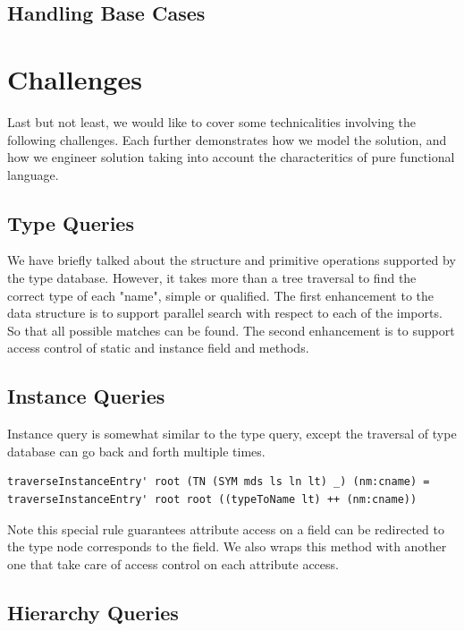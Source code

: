 \documentclass[12pt,letterpaper]{article}
\begin{document}
\subsection{Handling Base Cases}


\section{Challenges}
Last but not least, we would like to cover some technicalities involving the following challenges. Each further demonstrates how we model the solution, and how we engineer solution taking into account the characteritics of pure functional language.

\subsection{Type  Queries}
We have briefly talked about the structure and primitive operations supported by the type database. However, it takes more than a tree traversal to find the correct type of each "name", simple or qualified. The first enhancement to the data structure is to support parallel search with respect to each of the imports. So that all possible matches can be found. The second enhancement is to support access control of static and instance field and methods.

\subsection{Instance Queries}
Instance query is somewhat similar to the type query, except the traversal of type database can go back and forth multiple times.
\begin{lstlisting}
traverseInstanceEntry' root (TN (SYM mds ls ln lt) _) (nm:cname) = traverseInstanceEntry' root root ((typeToName lt) ++ (nm:cname))
\end{lstlisting}

Note this special rule guarantees attribute access on a field can be redirected to the type node corresponds to the field. We also wraps this method with another one that take care of access control on each attribute access.

\subsection{Hierarchy Queries}
\end{document}
